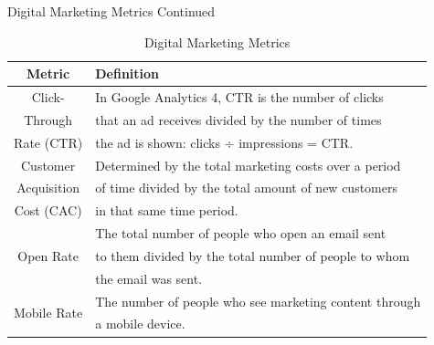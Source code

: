\documentclass[pdf]{beamer}
\theoremstyle{remark}
\theoremstyle{definition}
\begin{document}
\begin{frame}[t]{Digital Marketing Metrics Continued}
\footnotesize
\begin{table}[htbp]
  \centering
  \captionsetup{justification=centering}
    \begin{tabular}{|c|l|}
    \toprule
    Metric & Definition \\
    \midrule
    \midrule
     Click- & In Google Analytics 4, CTR is the  number of  clicks \\ 
     Through & that an ad receives divided by the number of times \\ 
    Rate (CTR) & the ad is shown: clicks ÷ impressions = CTR. \\
   \midrule 
   Customer & Determined by the total marketing costs over a period \\
    Acquisition & of time divided by the total amount of new customers \\
     Cost (CAC) & in that same time period.\\ 
    \midrule
   \multirow{3}{*}{Open Rate} &  The total number of people who open an email sent \\
   & to them divided by the total number of people to whom\\
   & the email was sent.\\
    \midrule 
   \multirow{2}{*}{Mobile Rate} & The number of people who see marketing content through \\
   & a mobile device. \\ 
    \bottomrule
     \end{tabular}%
  \caption{Digital Marketing Metrics}
  \label{tab:digitalmetrics}%
\end{table}%
\end{frame}
\end{document}
